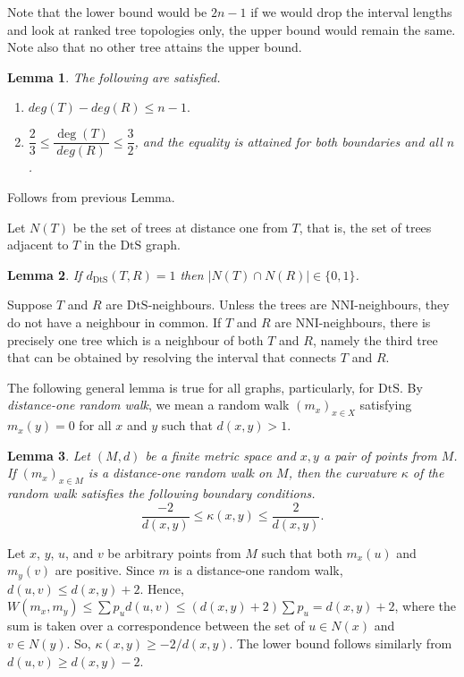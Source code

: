 \documentclass{amsart}
\newtheorem{lemma}{Lemma}
\newcommand{\dts}{\mathrm{DtS}}
\begin{document}
Note that the lower bound would be $2n-1$ if we would drop the interval lengths
and look at ranked tree topologies only, the upper bound would remain the same.
Note also that no other tree attains the upper bound. 

\begin{lemma}\label{degreeBounds}
The following are satisfied. 
\begin{enumerate}[(1)]
\item $deg(T)-deg(R) \leq n-1.$
\item $\dfrac23 \leq \dfrac{\deg(T)}{deg(R)} \leq \dfrac32$, and the equality is 
attained for both boundaries and all $n$. 
\end{enumerate}
\end{lemma}

\proof
Follows from previous Lemma. 
\endproof

Let $N(T)$ be the set of trees at distance one from $T$, that is, the set of
trees adjacent to $T$ in the $\dts$ graph. 

\begin{lemma}\label{intersecNeighb}
If $d_{\dts}(T,R) = 1$ then $|N(T)\cap N(R)|\in\{0,1\}$.
\end{lemma}

\proof
Suppose $T$ and $R$ are $\dts$-neighbours. Unless the trees are NNI-neighbours,
they do not have a neighbour in
common. If $T$ and $R$ are NNI-neighbours, there is precisely one tree which is
a neighbour of both $T$ and $R$, namely the third tree that can be obtained by
resolving the interval that connects $T$ and $R$. 
\endproof

The following general lemma is true for all graphs, particularly, for $\dts$. 
By {\em distance-one random walk}, we mean a random walk $(m_x)_{x \in X}$ 
satisfying $m_x(y) = 0$ for all $x$ and $y$ such that $d(x,y) > 1$. 

\begin{lemma}\label{curvBoundGeneral}
Let $(M,d)$ be a finite metric space and $x,y$ a pair of points from $M$. If
$(m_x)_{x \in M}$ is a distance-one random walk on $M$, then the curvature 
$\kappa$ of the random walk satisfies the following boundary conditions. 
\[
\dfrac{-2}{d(x,y)} \leq \kappa(x,y) \leq \dfrac{2}{d(x,y)}.
\]
\end{lemma}

\proof
Let $x$, $y$, $u$, and $v$ be arbitrary points from $M$ such that both $m_x(u)$
and $m_y(v)$ are positive. Since $m$ is a distance-one random walk, 
$d(u,v) \leq d(x,y) + 2$. Hence, 
$W(m_x,m_y) \leq \sum p_u d(u,v) \leq (d(x,y)+2)\sum p_u = d(x,y) + 2$, 
where the sum is taken over a correspondence between the set of $u \in N(x)$ and 
$v \in N(y)$. So, $\kappa(x,y) \geq - 2/d(x,y)$. The lower bound follows 
similarly from $d(u,v) \geq d(x,y) - 2$.
\endproof
\end{document}
